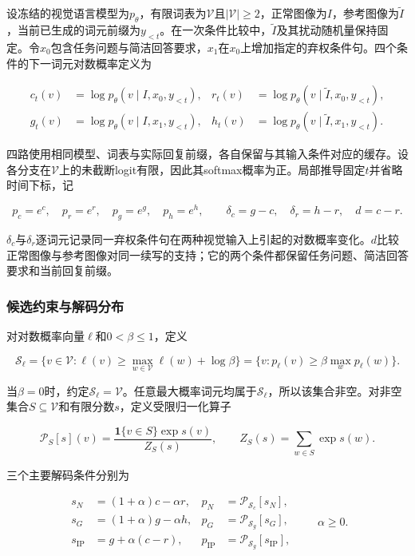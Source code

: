 设冻结的视觉语言模型为\(p_\theta\)，有限词表为\(\mathcal V\)且\(|\mathcal V|\geq2\)，正常图像为\(I\)，参考图像为\(\widetilde I\)，当前已生成的词元前缀为\(y_{<t}\)。在一次条件比较中，\(\widetilde I\)及其扰动随机量保持固定。令\(x_0\)包含任务问题与简洁回答要求，\(x_1\)在\(x_0\)上增加指定的弃权条件句。四个条件的下一词元对数概率定义为

\[
\begin{aligned}
c_t(v)&=\log p_\theta(v\mid I,x_0,y_{<t}),&
r_t(v)&=\log p_\theta(v\mid\widetilde I,x_0,y_{<t}),\\
g_t(v)&=\log p_\theta(v\mid I,x_1,y_{<t}),&
h_t(v)&=\log p_\theta(v\mid\widetilde I,x_1,y_{<t}).
\end{aligned}
\tag{D.1}
\]

四路使用相同模型、词表与实际回复前缀，各自保留与其输入条件对应的缓存。设各分支在\(\mathcal V\)上的未截断logit有限，因此其softmax概率为正。局部推导固定\(t\)并省略时间下标，记

\[
p_c=e^c,\quad p_r=e^r,\quad p_g=e^g,\quad p_h=e^h,
\qquad
\delta_c=g-c,\quad\delta_r=h-r,\quad d=c-r.
\tag{D.2}
\]

\(\delta_c\)与\(\delta_r\)逐词元记录同一弃权条件句在两种视觉输入上引起的对数概率变化。\(d\)比较正常图像与参考图像对同一续写的支持；它的两个条件都保留任务问题、简洁回答要求和当前回复前缀。

\subsubsection{候选约束与解码分布}\label{ux5019ux9009ux7ea6ux675fux4e0eux89e3ux7801ux5206ux5e03}

对对数概率向量\(\ell\)和\(0<\beta\leq1\)，定义

\[
\mathcal S_\ell
=\{v\in\mathcal V:\ell(v)\geq\max_{w\in\mathcal V}\ell(w)+\log\beta\}
=\{v:p_\ell(v)\geq\beta\max_w p_\ell(w)\}.
\tag{D.3}
\]

当\(\beta=0\)时，约定\(\mathcal S_\ell=\mathcal V\)。任意最大概率词元均属于\(\mathcal S_\ell\)，所以该集合非空。对非空集合\(S\subseteq\mathcal V\)和有限分数\(s\)，定义受限归一化算子

\[
\mathcal P_S[s](v)
=\frac{\mathbf1\{v\in S\}\exp s(v)}{Z_S(s)},
\qquad Z_S(s)=\sum_{w\in S}\exp s(w).
\tag{D.4}
\]

三个主要解码条件分别为

\[
\begin{aligned}
s_N&=(1+\alpha)c-\alpha r,&p_N&=\mathcal P_{\mathcal S_c}[s_N],\\
s_G&=(1+\alpha)g-\alpha h,&p_G&=\mathcal P_{\mathcal S_g}[s_G],\\
s_{\mathrm{IP}}&=g+\alpha(c-r),&p_{\mathrm{IP}}&=\mathcal P_{\mathcal S_g}[s_{\mathrm{IP}}],
\end{aligned}
\qquad \alpha\geq0.
\tag{D.5}
\]

